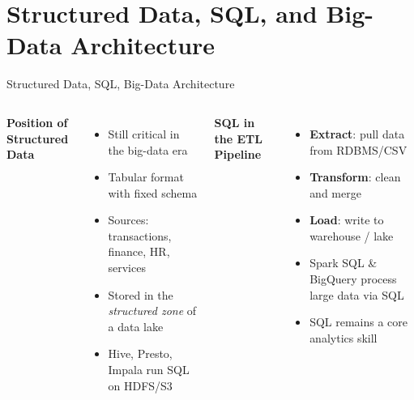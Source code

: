 \documentclass[aspectratio=169, table]{beamer}
\begin{document}
\section{Structured Data, SQL, and Big-Data Architecture}
\begin{frame}{Structured Data, SQL, Big-Data Architecture}
\vspace{20pt}

\begin{columns}[T]

\textbf{Position of Structured Data}
\begin{itemize}
	\item Still critical in the big-data era
	\item Tabular format with fixed schema
	\item Sources: transactions, finance, HR, services
	\item Stored in the \emph{structured zone} of a data lake
	\item Hive, Presto, Impala run SQL on HDFS/S3
\end{itemize}

\textbf{SQL in the ETL Pipeline}
\begin{itemize}
	\item \textbf{Extract}: pull data from RDBMS/CSV
	\item \textbf{Transform}: clean and merge
	\item \textbf{Load}: write to warehouse / lake
	\item Spark SQL \& BigQuery process large data via SQL
	\item SQL remains a core analytics skill
\end{itemize}

\end{columns}
\end{frame}

\end{document}
